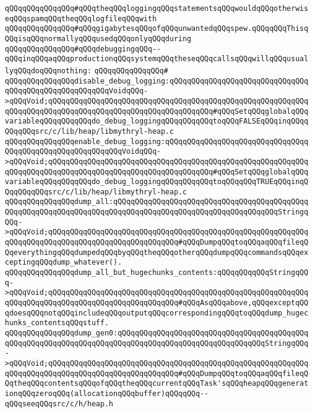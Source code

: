 \verb|qQQqqQQqqQQqqQQq#qQQqtheqQQqloggingqQQqstatementsqQQqwouldqQQqotherwiseqQQqspamqQQqtheqQQqlogfileqQQqwith|\newline
\verb|qQQqqQQqqQQqqQQq#qQQqgigabytesqQQqofqQQqunwantedqQQqspew.qQQqqQQqThisqQQqisqQQqnormallyqQQqusedqQQqonlyqQQqduring|\newline
\verb|qQQqqQQqqQQqqQQq#qQQqdebuggingqQQq--qQQqinqQQqaqQQqproductionqQQqsystemqQQqtheseqQQqcallsqQQqwillqQQqusuallyqQQqdoqQQqnothing:|\newline
\verb|qQQqqQQqqQQqqQQq#|\newline
\verb|qQQqqQQqqQQqqQQqdisable_debug_logging:qQQqqQQqqQQqqQQqqQQqqQQqqQQqqQQqqQQqqQQqqQQqqQQqqQQqqQQqVoidqQQq->qQQqVoid;qQQqqQQqqQQqqQQqqQQqqQQqqQQqqQQqqQQqqQQqqQQqqQQqqQQqqQQqqQQqqQQqqQQqqQQqqQQqqQQqqQQqqQQqqQQqqQQqqQQqqQQqqQQq#qQQqSetqQQqglobalqQQqvariableqQQqqQQqqQQqdo_debug_loggingqQQqqQQqqQQqtoqQQqFALSEqQQqinqQQqqQQqqQQqsrc/c/lib/heap/libmythryl-heap.c|\newline
\verb|qQQqqQQqqQQqqQQqenable_debug_logging:qQQqqQQqqQQqqQQqqQQqqQQqqQQqqQQqqQQqqQQqqQQqqQQqqQQqqQQqqQQqVoidqQQq->qQQqVoid;qQQqqQQqqQQqqQQqqQQqqQQqqQQqqQQqqQQqqQQqqQQqqQQqqQQqqQQqqQQqqQQqqQQqqQQqqQQqqQQqqQQqqQQqqQQqqQQqqQQqqQQqqQQq#qQQqSetqQQqglobalqQQqvariableqQQqqQQqqQQqdo_debug_loggingqQQqqQQqqQQqtoqQQqqQQqTRUEqQQqinqQQqqQQqqQQqsrc/c/lib/heap/libmythryl-heap.c|\newline
\newline
\verb|qQQqqQQqqQQqqQQqdump_all:qQQqqQQqqQQqqQQqqQQqqQQqqQQqqQQqqQQqqQQqqQQqqQQqqQQqqQQqqQQqqQQqqQQqqQQqqQQqqQQqqQQqqQQqqQQqqQQqqQQqqQQqqQQqStringqQQq->qQQqVoid;qQQqqQQqqQQqqQQqqQQqqQQqqQQqqQQqqQQqqQQqqQQqqQQqqQQqqQQqqQQqqQQqqQQqqQQqqQQqqQQqqQQqqQQqqQQqqQQqqQQq#qQQqDumpqQQqtoqQQqaqQQqfileqQQqeverythingqQQqdumpedqQQqbyqQQqtheqQQqotherqQQqdumpqQQqcommandsqQQqexceptingqQQqdump_whatever().|\newline
\verb|qQQqqQQqqQQqqQQqdump_all_but_hugechunks_contents:qQQqqQQqqQQqStringqQQq->qQQqVoid;qQQqqQQqqQQqqQQqqQQqqQQqqQQqqQQqqQQqqQQqqQQqqQQqqQQqqQQqqQQqqQQqqQQqqQQqqQQqqQQqqQQqqQQqqQQqqQQqqQQq#qQQqAsqQQqabove,qQQqexceptqQQqdoesqQQqnotqQQqincludeqQQqoutputqQQqcorrespondingqQQqtoqQQqdump_hugechunks_contentsqQQqstuff.|\newline
\verb|qQQqqQQqqQQqqQQqdump_gen0:qQQqqQQqqQQqqQQqqQQqqQQqqQQqqQQqqQQqqQQqqQQqqQQqqQQqqQQqqQQqqQQqqQQqqQQqqQQqqQQqqQQqqQQqqQQqqQQqqQQqqQQqStringqQQq->qQQqVoid;qQQqqQQqqQQqqQQqqQQqqQQqqQQqqQQqqQQqqQQqqQQqqQQqqQQqqQQqqQQqqQQqqQQqqQQqqQQqqQQqqQQqqQQqqQQqqQQqqQQq#qQQqDumpqQQqtoqQQqaqQQqfileqQQqtheqQQqcontentsqQQqofqQQqtheqQQqcurrentqQQqTask'sqQQqheapqQQqgenerationqQQqzeroqQQq(allocationqQQqbuffer)qQQqqQQq--qQQqseeqQQqsrc/c/h/heap.h|\newline
